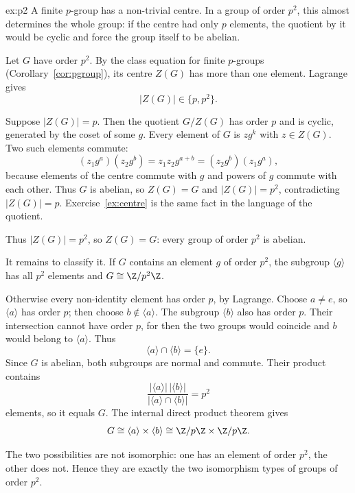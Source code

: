 \begin{solution}{ex:p2}
\idea A finite $p$-group has a non-trivial centre. In a group of order $p^2$, this almost determines the whole group: if the centre had only $p$ elements, the quotient by it would be cyclic and force the group itself to be abelian.

\writeup Let $G$ have order $p^2$. By the class equation for finite $p$-groups (Corollary~\ref{cor:pgroup}), its centre $Z(G)$ has more than one element. Lagrange gives
\[
|Z(G)|\in\{p,p^2\}.
\]

Suppose $|Z(G)|=p$. Then the quotient $G/Z(G)$ has order $p$ and is cyclic, generated by the coset of some $g$. Every element of $G$ is $zg^k$ with $z\in Z(G)$. Two such elements commute:
\[
(z_1g^a)(z_2g^b)=z_1z_2g^{a+b}=(z_2g^b)(z_1g^a),
\]
because elements of the centre commute with $g$ and powers of $g$ commute with each other. Thus $G$ is abelian, so $Z(G)=G$ and $|Z(G)|=p^2$, contradicting $|Z(G)|=p$. Exercise~\ref{ex:centre} is the same fact in the language of the quotient.

Thus $|Z(G)|=p^2$, so $Z(G)=G$: every group of order $p^2$ is abelian.

It remains to classify it. If $G$ contains an element $g$ of order $p^2$, the subgroup $\langle g\rangle$ has all $p^2$ elements and $G\cong\Z/p^2\Z$.

Otherwise every non-identity element has order $p$, by Lagrange. Choose $a\ne e$, so $\langle a\rangle$ has order $p$; then choose $b\notin\langle a\rangle$. The subgroup $\langle b\rangle$ also has order $p$. Their intersection cannot have order $p$, for then the two groups would coincide and $b$ would belong to $\langle a\rangle$. Thus
\[
\langle a\rangle\cap\langle b\rangle=\{e\}.
\]
Since $G$ is abelian, both subgroups are normal and commute. Their product contains
\[
\frac{|\langle a\rangle|\,|\langle b\rangle|}
{|\langle a\rangle\cap\langle b\rangle|}
=p^2
\]
elements, so it equals $G$. The internal direct product theorem gives
\[
G\cong\langle a\rangle\times\langle b\rangle
\cong\Z/p\Z\times\Z/p\Z.
\]

The two possibilities are not isomorphic: one has an element of order $p^2$, the other does not. Hence they are exactly the two isomorphism types of groups of order $p^2$.
\end{solution}

